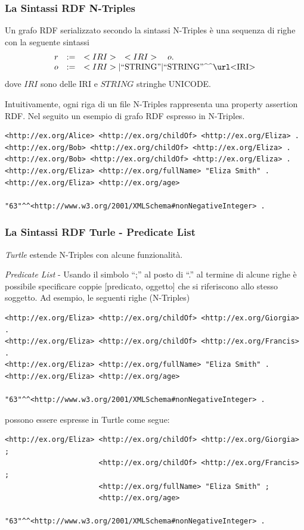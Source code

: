\documentclass[8pt]{beamer}
\begin{document}
\begin{frame}[fragile]
 \frametitle{La Sintassi RDF N-Triples}
 
 Un grafo RDF serializzato secondo la sintassi N-Triples \`e
 una sequenza di righe con la seguente sintassi
\[
\begin{array}{rcl}
 r & := & <IRI> \quad <IRI> \quad o . \\
 o & := & <IRI> | \stringLiteral{STRING} | \literal{STRING}{<IRI>}
\end{array} 
\]
dove $IRI$ sono delle IRI e $STRING$ stringhe UNICODE.
\vspace{\baselineskip}

Intuitivamente, ogni riga di un file N-Triples rappresenta 
una property assertion RDF. Nel seguito un esempio di grafo
RDF espresso in N-Triples.
\vspace{\baselineskip}


\begin{Verbatim}[fontsize=\small]
<http://ex.org/Alice> <http://ex.org/childOf> <http://ex.org/Eliza> .
<http://ex.org/Bob> <http://ex.org/childOf> <http://ex.org/Eliza> .
<http://ex.org/Bob> <http://ex.org/childOf> <http://ex.org/Eliza> .
<http://ex.org/Eliza> <http://ex.org/fullName> "Eliza Smith" .
<http://ex.org/Eliza> <http://ex.org/age> 
                        "63"^^<http://www.w3.org/2001/XMLSchema#nonNegativeInteger> .
\end{Verbatim}
\end{frame}

\begin{frame}[fragile]
 \frametitle{La Sintassi RDF Turle - Predicate List}
 
\emph{Turtle} estende N-Triples con alcune funzionalit\`a.
\vspace{\baselineskip}

\emph{Predicate List} - Usando il simbolo ``;'' al posto di ``.'' al termine di alcune righe \`e possibile
specificare coppie [predicato, oggetto] che si riferiscono allo stesso soggetto. Ad esempio, le seguenti
righe (N-Triples)

\begin{Verbatim}[fontsize=\small]
<http://ex.org/Eliza> <http://ex.org/childOf> <http://ex.org/Giorgia> .
<http://ex.org/Eliza> <http://ex.org/childOf> <http://ex.org/Francis> .
<http://ex.org/Eliza> <http://ex.org/fullName> "Eliza Smith" .
<http://ex.org/Eliza> <http://ex.org/age> 
                        "63"^^<http://www.w3.org/2001/XMLSchema#nonNegativeInteger> .
\end{Verbatim}

possono essere espresse in Turtle come segue:
\begin{Verbatim}[fontsize=\small]
<http://ex.org/Eliza> <http://ex.org/childOf> <http://ex.org/Giorgia> ;
                      <http://ex.org/childOf> <http://ex.org/Francis> ;
                      <http://ex.org/fullName> "Eliza Smith" ;
                      <http://ex.org/age> 
                         "63"^^<http://www.w3.org/2001/XMLSchema#nonNegativeInteger> .
\end{Verbatim}
\end{frame}
\end{document}
